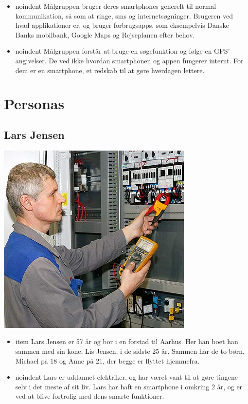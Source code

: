 \documentclass[12pt]{article}
\begin{document}
\begin{enumarate}
\begin{itemize}
\item noindent Målgruppen bruger deres smartphones generelt til normal kommunikation, så som at ringe, sms og internetsøgninger. Brugeren ved hvad applikationer er, og bruger forbrugsapps, som eksempelvis Danske Banks mobilbank, Google Maps og Rejseplanen efter behov.\\

\item noindent Målgruppen forstår at bruge en søgefunktion og følge en GPS' angivelser. De ved ikke hvordan smartphonen og appen fungerer internt. For dem er en smartphone, et redskab til at gøre hverdagen lettere.
\end{itemize}

\section*{Personas}

\subsection*{Lars Jensen}

\includegraphics[scale=0.5]{includes/lars.jpg}
\begin{itemize}
\item item Lars Jensen er 57 år og bor i en forstad til Aarhus. Her han boet han sammen med sin kone, Lis Jensen, i de sidste 25 år. Sammen har de to børn, Michael på 18 og Anne på 21, der begge er flyttet hjemmefra.\\

\item noindent Lars er uddannet elektriker, og har været vant til at gøre tingene selv i det meste af sit liv. Lars har haft en smartphone i omkring 2 år, og er ved at blive fortrolig med dens smarte funktioner.\\


\end{itemize}
\end{enumarate}
\end{document}
